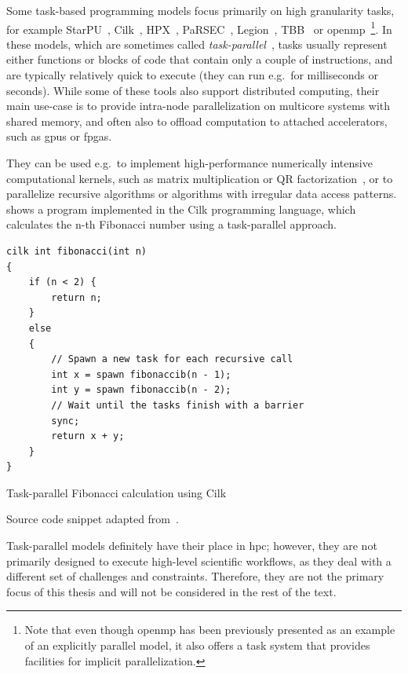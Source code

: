 Some task-based programming models focus primarily on high granularity tasks, for example
StarPU~\cite{starpu}, Cilk~\cite{cilk}, HPX~\cite{hpx},
PaRSEC~\cite{parsec}, Legion~\cite{legion}, TBB~\cite{tbb} or
\gls{openmp}~\cite{openmp}\footnote{Note that even though \gls{openmp} has been previously presented as an example of an
explicitly parallel model, it also offers a task system that provides facilities for implicit parallelization.}. In these models, which are
sometimes called \emph{task-parallel}~\cite{task_based_taxonomy}, tasks usually represent either
functions or blocks of code that contain only a couple of instructions, and are typically relatively
quick to execute (they can run e.g.\ for milliseconds or seconds). While some of these tools also
support distributed computing, their main use-case is to provide intra-node parallelization on
multicore systems with shared memory, and often also to offload computation to attached
accelerators, such as \glspl{gpu} or \glspl{fpga}.

They can be used e.g.\ to implement high-performance numerically intensive computational kernels,
such as matrix multiplication or QR factorization~\cite{qr_factorization}, or to parallelize
recursive algorithms or algorithms with irregular data access patterns. 
shows a program implemented in the Cilk programming language, which calculates the n-th Fibonacci
number using a task-parallel approach.

\begin{listing}
	\begin{verbatim}
cilk int fibonacci(int n)
{
	if (n < 2) {
		return n;
	}
	else
	{
		// Spawn a new task for each recursive call
		int x = spawn fibonaccib(n - 1);
		int y = spawn fibonaccib(n - 2);
		// Wait until the tasks finish with a barrier
		sync;
		return x + y;
	}
}
	\end{verbatim}
	\caption{Task-parallel Fibonacci calculation using Cilk}
	\centering Source code snippet adapted from~\cite{cilk}.
	\label{lst:cilk-fibonacci}
\end{listing}

Task-parallel models definitely have their place in \gls{hpc}; however, they are not
primarily designed to execute high-level scientific workflows, as they deal with a different set of
challenges and constraints. Therefore, they are not the primary focus of this thesis and will not
be considered in the rest of the text.

